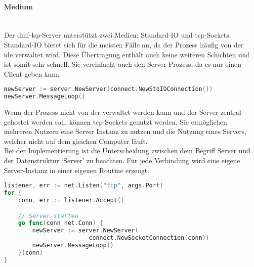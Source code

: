 \documentclass[./einleitung.tex]{subfiles}
\begin{document}
    \paragraph{Medium}\mbox{}\\
    Der \acrshort{dmf}-\acrshort{lsp}-Server unterstützt zwei Medien: Standard-IO und \acrshort{tcp}-Sockets.\\
    Standard-IO bietet sich für die meisten Fälle an, da der Prozess häufig von der \acrshort{ide} verwaltet wird.
    Diese Übertragung enthält auch keine weiteren Schichten und ist somit sehr schnell.
    Sie vereinfacht auch den Server Prozess, da es nur einen Client geben kann.
    \begin{lstlisting}[language=Go, caption=Start eines StdIO-Servers, label=lst:stdServer]
newServer := server.NewServer(connect.NewStdIOConnection())
newServer.MessageLoop()
    \end{lstlisting}
    Wenn der Prozess nicht von der  verwaltet werden kann und der Server zentral gehostet werden soll, können \acrshort{tcp}-Sockets genutzt werden.
    Sie ermöglichen mehreren Nutzern eine Server Instanz zu nutzen und die Nutzung eines Servers, welcher nicht auf dem gleichen Computer läuft.\\
    Bei der Implementierung ist die Unterscheidung zwischen dem Begriff Server und der Datenstruktur `Server' zu beachten.
    Für jede Verbindung wird eine eigene Server-Instanz in einer eigenen Routine erzeugt.
    \begin{lstlisting}[language=Go, caption=Verwaltung des \acrshort{tcp}-Servers, label=lst:tcpServer]
listener, err := net.Listen("tcp", args.Port)
for {
    conn, err := listener.Accept()

    // Server starten
    go func(conn net.Conn) {
        newServer := server.NewServer(
                        connect.NewSocketConnection(conn))
        newServer.MessageLoop()
    }(conn)
}
    \end{lstlisting}
\end{document}

